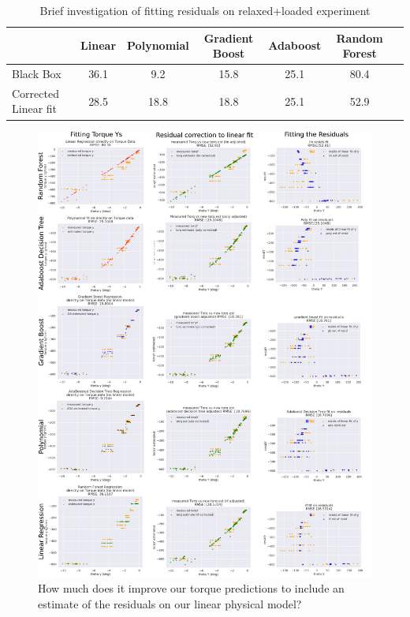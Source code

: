 \documentclass[preprint,12pt,3p]{elsarticle}
\begin{document}
\begin{table}[H]
    \centering
    \caption{Brief investigation of fitting residuals on relaxed+loaded experiment}\label{tab:MDP_calibration}
    \begin{tabular}{l|c|c|c|c|c|c}
         \hline \hline
         &  Linear & Polynomial & Gradient Boost & Adaboost & Random Forest\\
         \hline 
         Black Box          & 36.1 & 9.2 & 15.8 & 25.1 & 80.4 \\ 
         Corrected Linear fit & 28.5 & 18.8 & 18.8 & 25.1 & 52.9 \\
    \hline
    \end{tabular}
\end{table}


\begin{figure}[H]
\centering
\includegraphics[width=\textwidth]{images/residcorrect/layout_vertical.png}
\caption{How much does it improve our torque predictions to include an estimate of the residuals on
our linear physical model?}
\end{figure}
\end{document}
